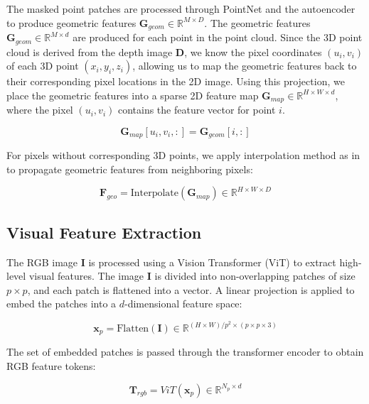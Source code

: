 \noindent The masked point patches are processed through PointNet \cite{qi2017pointnet} and the autoencoder to produce geometric features $\mathbf{G}_{geom} \in \mathbb{R}^{M \times D}$. The geometric features $\mathbf{G}_{geom} \in \mathbb{R}^{M \times d}$ are produced for each point in the point cloud. Since the 3D point cloud is derived from the depth image $\mathbf{D}$, we know the pixel coordinates $(u_i, v_i)$ of each 3D point $(x_i, y_i, z_i)$, allowing us to map the geometric features back to their corresponding pixel locations in the 2D image. Using this projection, we place the geometric features into a sparse 2D feature map $\mathbf{G}_{map} \in \mathbb{R}^{H \times W \times d}$, where the pixel $(u_i, v_i)$ contains the feature vector for point $i$.

\begin{equation}
\mathbf{G}_{map}[u_i, v_i, :] = \mathbf{G}_{geom}[i, :]
\end{equation}

\noindent For pixels without corresponding 3D points, we apply interpolation method as in \cite{wang2023multimodal} to propagate geometric features from neighboring pixels:

\begin{equation}
    \mathbf{F}_{geo} = \text{Interpolate}(\mathbf{G}_{map}) \in \mathbb{R}^{H \times W \times D}
\end{equation}

\subsection*{Visual Feature Extraction}

The RGB image $\mathbf{I}$ is processed using a Vision Transformer (ViT) \cite{dosovitskiy2020image} to extract high-level visual features. The image $\mathbf{I}$ is divided into non-overlapping patches of size $p \times p$, and each patch is flattened into a vector. A linear projection is applied to embed the patches into a $d$-dimensional feature space:

\begin{equation}
    \mathbf{x}_p = \text{Flatten}(\mathbf{I}) \in \mathbb{R}^{(H \times W) / p^2 \times (p \times p \times 3)}
\end{equation}

\noindent The set of embedded patches is passed through the transformer encoder to obtain RGB feature tokens:

\begin{equation}
    \mathbf{T}_{rgb} = ViT(\mathbf{x}_p) \in \mathbb{R}^{N_p \times d}
\end{equation}

